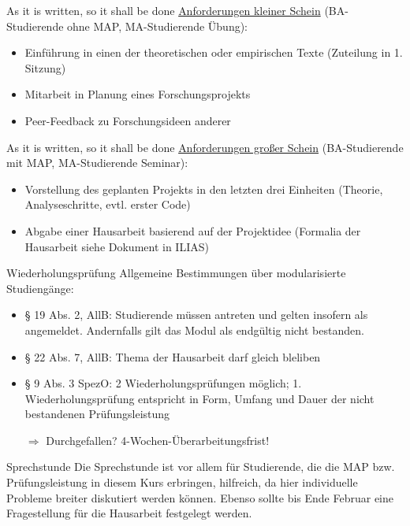 \documentclass[11pt]{beamer}
\begin{document}
\begin{frame}[t]{As it is written, so it shall be done}
\underline{Anforderungen kleiner Schein} (BA-Studierende ohne MAP, MA-Studierende Übung):
	\begin{itemize}
		\item Einführung in einen der theoretischen oder empirischen Texte (Zuteilung in 1. Sitzung)
		\item Mitarbeit in Planung eines Forschungsprojekts
		\item Peer-Feedback zu Forschungsideen anderer 
	\end{itemize}
\end{frame}

\begin{frame}[t]{As it is written, so it shall be done}
\underline{Anforderungen großer Schein} (BA-Studierende mit MAP, MA-Studierende Seminar):
	\begin{itemize}
		\item Vorstellung des geplanten Projekts in den letzten drei Einheiten (Theorie, Analyseschritte, evtl. erster Code)
		\item Abgabe einer Hausarbeit basierend auf der Projektidee (Formalia der Hausarbeit siehe Dokument in ILIAS)
	\end{itemize}
\end{frame}

\begin{frame}[t]{Wiederholungsprüfung}
Allgemeine Bestimmungen über modularisierte Studiengänge: \\
	\begin{itemize}
		\item § 19 Abs. 2, AllB: Studierende müssen  antreten und gelten insofern als angemeldet. Andernfalls gilt das Modul als endgültig nicht bestanden.
		\item § 22 Abs. 7, AllB: Thema der Hausarbeit darf gleich bleliben
		\item § 9 Abs. 3 SpezO: 2 Wiederholungsprüfungen möglich; 1. Wiederholungsprüfung entspricht in Form, Umfang und Dauer der nicht bestandenen Prüfungsleistung
		\item[$\Rightarrow$] Durchgefallen? 4-Wochen-Überarbeitungsfrist!
	\end{itemize}
\end{frame}

\begin{frame}[t]{Sprechstunde}
Die Sprechstunde ist vor allem für Studierende, die die MAP bzw. Prüfungsleistung in diesem Kurs erbringen, hilfreich, da hier individuelle Probleme breiter diskutiert werden können. Ebenso sollte bis Ende Februar eine Fragestellung für die Hausarbeit festgelegt werden. 

\end{frame}
\end{document}
